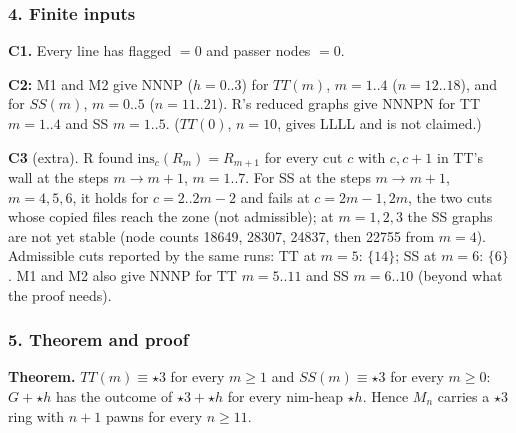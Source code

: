 \subsubsection*{4. Finite inputs}
\textbf{C1.} Every line has flagged $=0$ and passer nodes $=0$.

\par{}\par\smallskip
\textbf{C2:} M1 and M2 give NNNP ($h=0..3$) for $TT(m)$, $m=1..4$ ($n=12..18$), and for $SS(m)$, $m=0..5$ ($n=11..21$). R's reduced graphs give NNNPN for TT $m=1..4$ and SS $m=1..5$. ($TT(0)$, $n=10$, gives LLLL and is not claimed.)

\textbf{C3} (extra). R found $\mathrm{ins}_c(R_m)=R_{m+1}$ for every cut $c$ with $c,c+1$ in TT's wall at the steps $m\to m+1$, $m=1..7$. For SS at the steps $m\to m+1$, $m=4,5,6$, it holds for $c=2..2m-2$ and fails at $c=2m-1,2m$, the two cuts whose copied files reach the zone (not admissible); at $m=1,2,3$ the SS graphs are not yet stable (node counts 18649, 28307, 24837, then 22755 from $m=4$). Admissible cuts reported by the same runs: TT at $m=5$: $\{14\}$; SS at $m=6$: $\{6\}$. M1 and M2 also give NNNP for TT $m=5..11$ and SS $m=6..10$ (beyond what the proof needs).

\subsubsection*{5. Theorem and proof}
\textbf{Theorem.} $TT(m)\equiv\star3$ for every $m\ge1$ and $SS(m)\equiv\star3$ for every $m\ge0$: $G+\star h$ has the outcome of $\star3+\star h$ for every nim-heap $\star h$. Hence $M_n$ carries a $\star3$ ring with $n+1$ pawns for every $n\ge11$.

